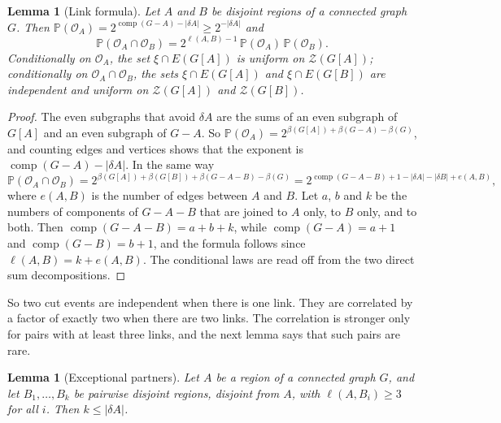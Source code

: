 \documentclass[11pt]{article}
\newtheorem{lemma}[theorem]{Lemma}
\theoremstyle{definition}
\theoremstyle{remark}
\newcommand{\Z}{\mathcal{Z}}
\newcommand{\PP}{\mathbb{P}}
\newcommand{\comp}{\operatorname{comp}}
\newcommand{\cO}{\mathcal{O}}
\numberwithin{equation}{section}
\begin{document}
\begin{lemma}[Link formula]\label{lem:link}
Let $A$ and $B$ be disjoint regions of a connected graph $G$. Then
$\PP(\cO_A)=2^{\comp(G-A)-|\delta A|}\ge2^{-|\delta A|}$ and
\[
  \PP(\cO_A\cap\cO_B)=2^{\ell(A,B)-1}\,\PP(\cO_A)\,\PP(\cO_B).
\]
Conditionally on $\cO_A$, the set $\xi\cap E(G[A])$ is uniform on $\Z(G[A])$; conditionally on
$\cO_A\cap\cO_B$, the sets $\xi\cap E(G[A])$ and $\xi\cap E(G[B])$ are independent and uniform on
$\Z(G[A])$ and $\Z(G[B])$.
\end{lemma}

\begin{proof}
The even subgraphs that avoid $\delta A$ are the sums of an even subgraph of $G[A]$ and an even
subgraph of $G-A$. So $\PP(\cO_A)=2^{\beta(G[A])+\beta(G-A)-\beta(G)}$, and counting edges and
vertices shows that the exponent is $\comp(G-A)-|\delta A|$. In the same way
\[
  \PP(\cO_A\cap\cO_B)=2^{\beta(G[A])+\beta(G[B])+\beta(G-A-B)-\beta(G)}
     =2^{\comp(G-A-B)+1-|\delta A|-|\delta B|+e(A,B)},
\]
where $e(A,B)$ is the number of edges between $A$ and $B$. Let $a$, $b$ and $k$ be the numbers of
components of $G-A-B$ that are joined to $A$ only, to $B$ only, and to both. Then
$\comp(G-A-B)=a+b+k$, while $\comp(G-A)=a+1$ and $\comp(G-B)=b+1$, and the formula follows since
$\ell(A,B)=k+e(A,B)$. The conditional laws are read off from the two direct sum decompositions.
\end{proof}

So two cut events are independent when there is one link. They are correlated by a factor of
exactly two when there are two links. The correlation is stronger only for pairs with at least
three links, and the next lemma says that such pairs are rare.

\begin{lemma}[Exceptional partners]\label{lem:exc}
Let $A$ be a region of a connected graph $G$, and let $B_1,\dots,B_k$ be pairwise disjoint regions,
disjoint from $A$, with $\ell(A,B_i)\ge3$ for all $i$. Then $k\le|\delta A|$.
\end{lemma}
\end{document}

